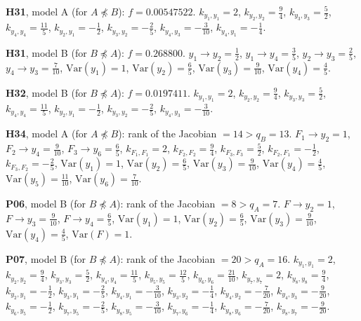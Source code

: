 \documentclass[10pt,a4paper]{article}
\newcommand{\nnest}{\not\preceq}
\begin{document}
{\noindent\textbf{H31}, model A (for $A\nnest B$): $f=0.00547522$. {\footnotesize $k_{y_{1},y_{1}}=2$, $k_{y_{2},y_{2}}=\tfrac{9}{4}$, $k_{y_{3},y_{3}}=\tfrac{5}{2}$, $k_{y_{4},y_{4}}=\tfrac{11}{5}$, $k_{y_{2},y_{1}}=-\tfrac{1}{2}$, $k_{y_{3},y_{2}}=-\tfrac{2}{5}$, $k_{y_{4},y_{3}}=-\tfrac{3}{10}$, $k_{y_{4},y_{1}}=-\tfrac{1}{4}$.}\par\smallskip
\noindent\textbf{H31}, model B (for $B\nnest A$): $f=0.268800$. {\footnotesize $y_{1}\to y_{2}=\tfrac{1}{2}$, $y_{1}\to y_{4}=\tfrac{3}{5}$, $y_{2}\to y_{3}=\tfrac{2}{5}$, $y_{4}\to y_{3}=\tfrac{7}{10}$, $\mathrm{Var}(y_{1})=1$, $\mathrm{Var}(y_{2})=\tfrac{6}{5}$, $\mathrm{Var}(y_{3})=\tfrac{9}{10}$, $\mathrm{Var}(y_{4})=\tfrac{4}{5}$.}\par\smallskip
\noindent\textbf{H32}, model B (for $B\nnest A$): $f=0.0197411$. {\footnotesize $k_{y_{1},y_{1}}=2$, $k_{y_{2},y_{2}}=\tfrac{9}{4}$, $k_{y_{3},y_{3}}=\tfrac{5}{2}$, $k_{y_{4},y_{4}}=\tfrac{11}{5}$, $k_{y_{2},y_{1}}=-\tfrac{1}{2}$, $k_{y_{3},y_{2}}=-\tfrac{2}{5}$, $k_{y_{4},y_{3}}=-\tfrac{3}{10}$.}\par\smallskip
\noindent\textbf{H34}, model A (for $A\nnest B$): rank of the Jacobian $=14>q_B=13$. {\footnotesize $F_{1}\to y_{2}=1$, $F_{2}\to y_{4}=\tfrac{9}{10}$, $F_{3}\to y_{6}=\tfrac{6}{5}$, $k_{F_{1},F_{1}}=2$, $k_{F_{2},F_{2}}=\tfrac{9}{4}$, $k_{F_{3},F_{3}}=\tfrac{5}{2}$, $k_{F_{2},F_{1}}=-\tfrac{1}{2}$, $k_{F_{3},F_{2}}=-\tfrac{2}{5}$, $\mathrm{Var}(y_{1})=1$, $\mathrm{Var}(y_{2})=\tfrac{6}{5}$, $\mathrm{Var}(y_{3})=\tfrac{9}{10}$, $\mathrm{Var}(y_{4})=\tfrac{4}{5}$, $\mathrm{Var}(y_{5})=\tfrac{11}{10}$, $\mathrm{Var}(y_{6})=\tfrac{7}{10}$.}\par\smallskip
\noindent\textbf{P06}, model B (for $B\nnest A$): rank of the Jacobian $=8>q_A=7$. {\footnotesize $F\to y_{2}=1$, $F\to y_{3}=\tfrac{9}{10}$, $F\to y_{4}=\tfrac{6}{5}$, $\mathrm{Var}(y_{1})=1$, $\mathrm{Var}(y_{2})=\tfrac{6}{5}$, $\mathrm{Var}(y_{3})=\tfrac{9}{10}$, $\mathrm{Var}(y_{4})=\tfrac{4}{5}$, $\mathrm{Var}(F)=1$.}\par\smallskip
\noindent\textbf{P07}, model B (for $B\nnest A$): rank of the Jacobian $=20>q_A=16$. {\footnotesize $k_{y_{1},y_{1}}=2$, $k_{y_{2},y_{2}}=\tfrac{9}{4}$, $k_{y_{3},y_{3}}=\tfrac{5}{2}$, $k_{y_{4},y_{4}}=\tfrac{11}{5}$, $k_{y_{5},y_{5}}=\tfrac{12}{5}$, $k_{y_{6},y_{6}}=\tfrac{21}{10}$, $k_{y_{7},y_{7}}=2$, $k_{y_{8},y_{8}}=\tfrac{9}{4}$, $k_{y_{2},y_{1}}=-\tfrac{1}{2}$, $k_{y_{3},y_{1}}=-\tfrac{2}{5}$, $k_{y_{4},y_{1}}=-\tfrac{3}{10}$, $k_{y_{3},y_{2}}=-\tfrac{1}{4}$, $k_{y_{4},y_{2}}=-\tfrac{7}{20}$, $k_{y_{4},y_{3}}=-\tfrac{9}{20}$, $k_{y_{6},y_{5}}=-\tfrac{1}{2}$, $k_{y_{7},y_{5}}=-\tfrac{2}{5}$, $k_{y_{8},y_{5}}=-\tfrac{3}{10}$, $k_{y_{7},y_{6}}=-\tfrac{1}{4}$, $k_{y_{8},y_{6}}=-\tfrac{7}{20}$, $k_{y_{8},y_{7}}=-\tfrac{9}{20}$.}\par\smallskip
}
\end{document}
